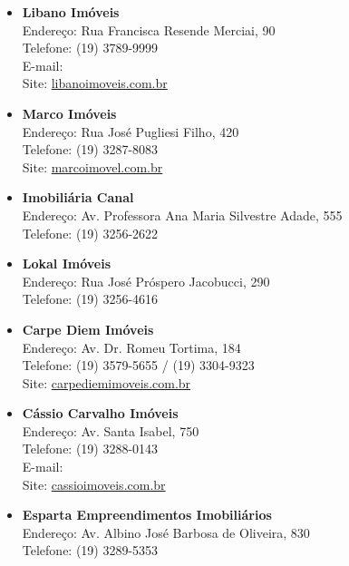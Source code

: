 \begin{itemize}
\item   \textbf{Libano Imóveis}
		\\Endereço: Rua Francisca Resende Merciai, 90
		\\Telefone: (19) 3789-9999
		\\E-mail: 
		\\Site: \url{libanoimoveis.com.br}

\item   \textbf{Marco Imóveis}
		\\Endereço: Rua José Pugliesi Filho, 420
		\\Telefone: (19) 3287-8083
		\\Site: \url{marcoimovel.com.br}

\item   \textbf{Imobiliária Canal}
		\\Endereço: Av. Professora Ana Maria Silvestre Adade, 555
		\\Telefone: (19) 3256-2622

\item   \textbf{Lokal Imóveis}
		\\Endereço: Rua José Próspero Jacobucci, 290
		\\Telefone: (19) 3256-4616

\item   \textbf{Carpe Diem Imóveis}
		\\Endereço: Av. Dr. Romeu Tortima, 184
		\\Telefone: (19) 3579-5655 / (19) 3304-9323
		\\Site: \url{carpediemimoveis.com.br}

\item   \textbf{Cássio Carvalho Imóveis}
		\\Endereço: Av. Santa Isabel, 750
		\\Telefone: (19) 3288-0143
		\\E-mail: 
		\\Site: \url{cassioimoveis.com.br}


\item   \textbf{Esparta Empreendimentos Imobiliários}
        \\Endereço: Av. Albino José Barbosa de Oliveira, 830
        \\Telefone: (19) 3289-5353


\end{itemize}
